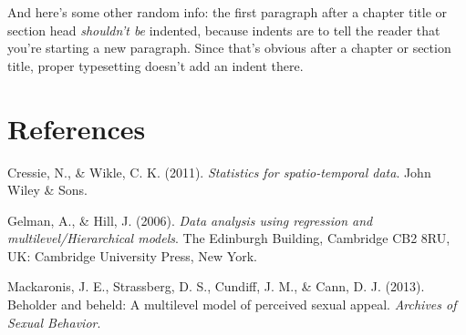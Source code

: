 \documentclass[12pt,twoside]{reedthesis}
\begin{document}
  And here's some other random info: the first paragraph after a chapter
  title or section head \emph{shouldn't be} indented, because indents are
  to tell the reader that you're starting a new paragraph. Since that's
  obvious after a chapter or section title, proper typesetting doesn't add
  an indent there.
  
  \backmatter
  
  \chapter{References}\label{references}
  
  \noindent
  
  \setlength{\parindent}{-0.20in} \setlength{\leftskip}{0.20in}
  \setlength{\parskip}{8pt}
  
  \hypertarget{refs}{}
  \hypertarget{ref-cressie2011}{}
  Cressie, N., \& Wikle, C. K. (2011). \emph{Statistics for
  spatio-temporal data}. John Wiley \& Sons.
  
  \hypertarget{ref-gelman}{}
  Gelman, A., \& Hill, J. (2006). \emph{Data analysis using regression and
  multilevel/Hierarchical models}. The Edinburgh Building, Cambridge CB2
  8RU, UK: Cambridge University Press, New York.
  
  \hypertarget{ref-mackaronis2013}{}
  Mackaronis, J. E., Strassberg, D. S., Cundiff, J. M., \& Cann, D. J.
  (2013). Beholder and beheld: A multilevel model of perceived sexual
  appeal. \emph{Archives of Sexual Behavior}.


\end{document}
